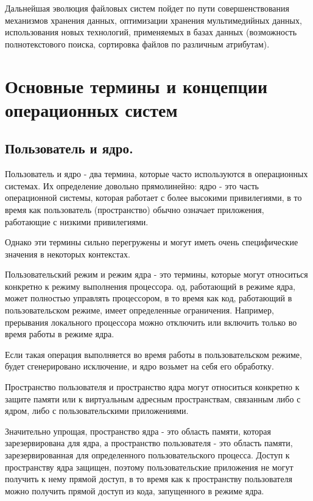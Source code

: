 \documentclass{article}
\begin{document}
    Дальнейшая эволюция файловых систем пойдет по пути совершенствования 
    механизмов хранения данных, оптимизации хранения мультимедийных данных, 
    использования новых технологий, применяемых в базах данных (возможность 
    полнотекстового поиска, сортировка файлов по различным атрибутам).

    \section{Основные термины и концепции \newline операционных систем}
    \subsection{Пользователь и ядро.}
    Пользователь и ядро - два термина, которые часто используются в 
    операционных системах. Их определение довольно прямолинейно: ядро - это
    часть операционной системы, которая работает с более высокими привилегиями, 
    в то время как пользователь (пространство) обычно означает приложения, 
    работающие с низкими привилегиями.

    Однако эти термины сильно перегружены и могут иметь очень специфические 
    значения в некоторых контекстах.

    Пользовательский режим и режим ядра - это термины, которые могут относиться 
    конкретно к режиму выполнения процессора. од, работающий в режиме ядра, 
    может полностью управлять процессором, в то время как код, работающий в 
    пользовательском режиме, имеет определенные ограничения. Например, 
    прерывания локального процессора можно отключить или включить 
    только во время работы в режиме ядра.

    Если такая операция выполняется во время работы в пользовательском режиме, 
    будет сгенерировано исключение, и ядро возьмет на себя его обработку.

    Пространство пользователя и пространство ядра могут относиться конкретно к 
    защите памяти или к виртуальным адресным пространствам, связанным либо с 
    ядром, либо с пользовательскими приложениями.

    Значительно упрощая, пространство ядра - это область памяти, которая 
    зарезервирована для ядра, а пространство пользователя - это область памяти, 
    зарезервированная для определенного пользовательского процесса. Доступ к 
    пространству ядра защищен, поэтому пользовательские приложения не могут 
    получить к нему прямой доступ, в то время как к пространству пользователя 
    можно получить прямой доступ из кода, запущенного в режиме ядра.
\end{document}

